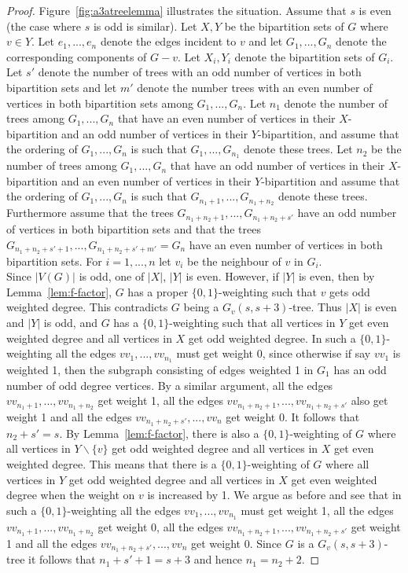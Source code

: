 \documentclass[
final,
 nomarks,
]{dmtcs-episciences}
\theoremstyle{definition}
\begin{document}
\begin{proof} 
Figure~\ref{fig:a3atreelemma} illustrates the situation. Assume that $s$ is even (the case where $s$ is odd is similar). Let $X,Y$ be the bipartition sets of $G$ where $v \in Y$. Let $e_1,...,e_n$ denote the edges incident to $v$ and let $G_1,...,G_n$ denote the corresponding components of $G-v$. Let $X_i, Y_i$ denote the bipartition sets of $G_i$. Let $s'$ denote the number of trees with an odd number of vertices in both bipartition sets and let $m'$ denote the number trees with an even number of vertices in both bipartition sets among $G_1,...,G_n$. Let $n_1$ denote the number of trees among $G_1,...,G_n$ that have an even number of vertices in their $X$-bipartition and an odd number of vertices in their $Y$-bipartition, and assume that the ordering of $G_1,...,G_n$ is such that $G_1, ..., G_{n_1}$ denote these trees. Let $n_2$ be the number of trees among $G_1,...,G_n$ that have an odd number of vertices in their $X$-bipartition and an even number of vertices in their $Y$-bipartition and assume that the ordering of $G_1,...,G_n$ is such that $G_{n_1+1}, ..., G_{n_1+n_2}$ denote these trees. Furthermore assume that the trees $G_{n_1+n_2+1},...,G_{n_1+n_2+s'}$ have an odd number of vertices in both bipartition sets and that the trees $G_{n_1+n_2+s'+1},...,G_{n_1+n_2+s'+m'}=G_n$ have an even number of vertices in both bipartition sets. For $i=1,...,n$ let $v_i$ be the neighbour of $v$ in $G_i$. 
\\
Since $|V(G)|$ is odd, one of $|X|$, $|Y|$ is even. However, if $|Y|$ is even, then by Lemma~\ref{lem:f-factor}, $G$ has a proper $\{0,1\}$-weighting such that $v$ gets odd weighted degree. This contradicts $G$ being a $G_v(s,s+3)$-tree. Thus $|X|$ is even and $|Y|$ is odd, and $G$ has a $\{0,1\}$-weighting such that all vertices in $Y$ get even weighted degree and all vertices in $X$ get odd weighted degree. In such a $\{0,1\}$-weighting all the edges $vv_1,..., vv_{n_1}$ must get weight 0, since otherwise if say $vv_1$ is weighted 1, then the subgraph consisting of edges weighted 1 in $G_1$ has an odd number of odd degree vertices. By a similar argument, all the edges $vv_{n_1+1},...,vv_{n_1+n_2}$ get weight 1, all the edges $vv_{n_1+n_2+1},...,vv_{n_1+n_2+s'}$ also get weight 1 and all the edges $vv_{n_1+n_2+s'},...,vv_n$ get weight 0. It follows that $n_2+s'=s$. By Lemma~\ref{lem:f-factor}, there is also a $\{0,1\}$-weighting of $G$ where all vertices in $Y\backslash \{v\}$ get odd weighted degree and all vertices in $X$ get even weighted degree. This means that there is a $\{0,1\}$-weighting of $G$ where all vertices in $Y$ get odd weighted degree and all vertices in $X$ get even weighted degree when the weight on $v$ is increased by 1. We argue as before and see that in such a $\{0,1\}$-weighting all the edges $vv_1,..., vv_{n_1}$ must get weight 1, all the edges $vv_{n_1+1},...,vv_{n_1+n_2}$ get weight 0, all the edges $vv_{n_1+n_2+1},...,vv_{n_1+n_2+s'}$ get weight 1 and all the edges $vv_{n_1+n_2+s'},...,vv_n$ get weight 0. Since $G$ is a $G_v(s,s+3)$-tree it follows that $n_1+s'+1=s+3$ and hence $n_1=n_2+2$.

\end{proof}
\end{document}
